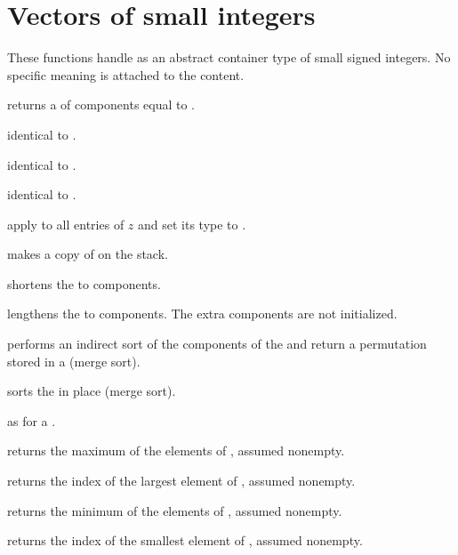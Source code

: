 \section{Vectors of small integers}


These functions handle  as an abstract container type
of small signed integers. No specific meaning is attached to the content.

 returns a 
of  components equal to .

 identical to .

 identical to .

 identical to .

 apply  to all entries
of $z$ and set its type to .

 makes a copy of  on the stack.

 shortens the  
to  components.

 lengthens the 
 to  components. The extra components are not initialized.

 performs an indirect sort of the
components of the   and return a permutation stored in a
 (merge sort).

 sorts the   in place
(merge sort).

 as  for a 
.

 returns the maximum of the elements of
 , assumed nonempty.

 returns the index of the largest
element of  , assumed nonempty.

 returns the minimum of the elements of
 , assumed nonempty.

 returns the index of the smallest
element of  , assumed nonempty.

